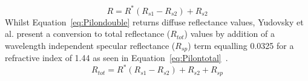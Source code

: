 \begin{equation}
    R = R^*(R_{s1} - R_{s2}) + R_{s2}
\label{eq:Pilondouble}
\end{equation}
Whilst Equation~\eqref{eq:Pilondouble} returns diffuse reflectance values, Yudovsky et al. present a conversion to total reflectance ($R_{tot}$) values by addition of a wavelength independent specular reflectance ($R_{sp}$) term equalling 0.0325 for a refractive index of 1.44 as seen in Equation~\eqref{eq:Pilontotal}~\citep{Yudovsky2011a}.
\begin{equation}
    R_{tot} = R^*(R_{s1} - R_{s2}) + R_{s2} +R_{sp}
\label{eq:Pilontotal}
\end{equation}


